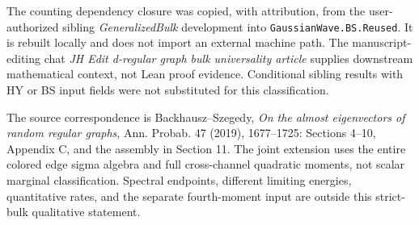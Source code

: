 \documentclass[11pt]{article}
\newcommand{\lean}[1]{{\small\nolinkurl{#1}}}
\begin{document}
The counting dependency closure was copied, with attribution, from the
user-authorized sibling \emph{GeneralizedBulk} development into
\lean{GaussianWave.BS.Reused}. It is rebuilt locally and does not import
an external machine path. The manuscript-editing chat
\emph{JH Edit d-regular graph bulk universality article} supplies downstream
mathematical context, not Lean proof evidence. Conditional sibling results
with HY or BS input fields were not substituted for this classification.

The source correspondence is Backhausz--Szegedy, \emph{On the almost
eigenvectors of random regular graphs}, Ann. Probab. 47 (2019),
1677--1725: Sections 4--10, Appendix C, and the assembly in Section 11.
The joint extension uses the entire colored edge sigma algebra and full
cross-channel quadratic moments, not scalar marginal classification.
Spectral endpoints, different limiting energies, quantitative rates, and
the separate fourth-moment input are outside this strict-bulk qualitative
statement.
\end{document}

